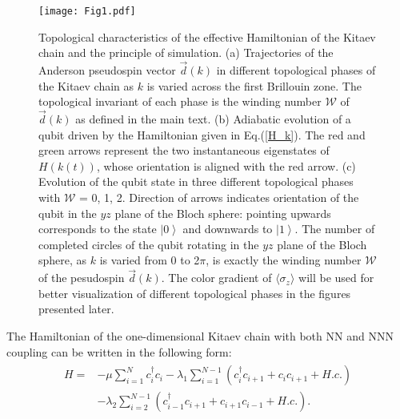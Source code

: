 \documentclass[aps,reprint,groupedaddress,showpacs,superscriptaddress]{revtex4-1}
\newcommand{\ket}[1]{\left| #1 \right>} %
\begin{document}
\begin{figure}
	\centering
	\texttt{[image: Fig1.pdf]}
	\caption{Topological characteristics of the effective Hamiltonian of the Kitaev chain and the principle of simulation. (a) Trajectories of the Anderson pseudospin vector $\vec{d}(k)$ in different topological phases of the Kitaev chain as $k$ is varied across the first Brillouin zone. The topological invariant of each phase is the winding number $\mathcal{W}$ of $\vec{d}(k)$ as defined in the main text. (b) Adiabatic evolution of a qubit driven by the Hamiltonian given in Eq.(\ref{H_k}). The red and green arrows represent the two instantaneous eigenstates of $H(k(t))$, whose orientation is aligned with the red arrow. (c) Evolution of the qubit state in three different topological phases with $\mathcal{W}$ = 0, 1, 2. Direction of arrows indicates orientation of the qubit in the $yz$ plane of the Bloch sphere: pointing upwards corresponds to the state $\ket{0}$ and downwards to $\ket{1}$. The number of completed circles of the qubit rotating in the $yz$ plane of the Bloch sphere, as $k$ is varied from 0 to 2$\pi$, is exactly the winding number $\mathcal{W}$ of the pesudospin $\vec{d}(k)$. The color gradient of $\langle\sigma_{z}\rangle$ will be used for better visualization of  different topological phases in the figures presented later.}\label{Fig1}
\end{figure}

The Hamiltonian of the one-dimensional Kitaev chain with both NN and NNN coupling can be written in the following form:
\begin{equation}\label{hami_Kitaev}
\begin{split}
\begin{aligned}
H = {}& -\mu \sum_{i=1}^{N}c_{i}^{\dagger} c_{i}-\lambda_{1}\sum_{i=1}^{N-1}(c_{i}^{\dagger}c_{i+1}+c_{i}c_{i+1}+H.c.)\\
&-\lambda_{2} \sum_{i=2}^{N-1}(c_{i-1}^{\dagger} c_{i+1}+c_{i+1} c_{i-1}+ H.c.).
\end{aligned}
\end{split}
\end{equation}
\end{document}
